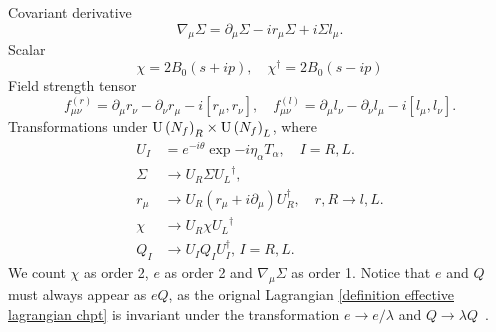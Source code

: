 Covariant derivative
%
\begin{equation}
    \nabla_\mu\Sigma = \partial_\mu \Sigma - ir_\mu \Sigma + i \Sigma l_\mu.
\end{equation}
%
Scalar
%
\begin{equation}
    \chi = 2 B_0 (s + ip), \quad \chi^\dagger = 2 B_0 (s - ip)  
\end{equation}
%
Field strength tensor
%
\begin{equation}
    f_{\mu \nu}^{(r)} = \partial_\mu r_\nu - \partial_\nu r_\mu - i[r_\mu, r_\nu], 
    \quad f_{\mu \nu}^{(l)} = \partial_\mu l_\nu - \partial_\nu l_\mu - i[l_\mu, l_\nu].
\end{equation}
%
Transformations under $\text{U}\left(N_f\right)_R \times \text{U}\left(N_f\right)_L$, where
\begin{align}
    U_I &= e^{-i\theta} \exp{-i \eta_\alpha T_\alpha }, \quad I = R, L. \\
    \Sigma &\rightarrow U_R \Sigma {U_L}^\dagger, \\
    r_\mu &\rightarrow U_R (r_\mu + i\partial_\mu) U_R^\dagger, \quad 
    r, R \rightarrow l, L. \\
    \chi &\rightarrow U_R \chi {U_L}^\dagger \\
    Q_I &\rightarrow U_I Q_I U_I^\dagger, \, I = R, L.
\end{align}
%
We count $\chi$ as order 2, $e$ as order 2 and $\nabla_\mu\Sigma$ as order 1.
Notice that $e$ and $Q$ must always appear as $e Q$, as the orignal Lagrangian \autoref{definition effective lagrangian chpt} is invariant under the transformation $e \rightarrow e/\lambda$ and $Q \rightarrow \lambda Q$~\autocite{pencoIntroductionEffectiveField2020}.